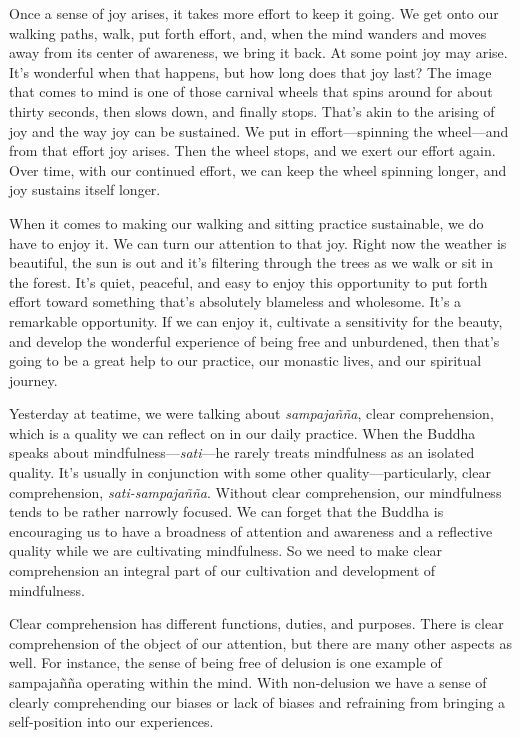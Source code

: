 Once a sense of joy arises, it takes more effort to keep it going. We 
get onto our walking paths, walk, put forth effort, and, when the mind 
wanders and moves away from its center of awareness, we bring it back. 
At some point joy may arise. It's wonderful when that happens, but how 
long does that joy last? The image that comes to mind is one of those 
carnival wheels that spins around for about thirty seconds, then slows 
down, and finally stops. That's akin to the arising of joy and the way 
joy can be sustained. We put in effort---spinning the wheel---and from 
that effort joy arises. Then the wheel stops, and we exert our effort 
again. Over time, with our continued effort, we can keep the wheel 
spinning longer, and joy sustains itself longer.

When it comes to making our walking and sitting practice sustainable, 
we do have to enjoy it. We can turn our attention to that joy. Right 
now the weather is beautiful, the sun is out and it's filtering through 
the trees as we walk or sit in the forest. It's quiet, peaceful, and 
easy to enjoy this opportunity to put forth effort toward something 
that's absolutely blameless and wholesome. It's a remarkable 
opportunity. If we can enjoy it, cultivate a sensitivity for the 
beauty, and develop the wonderful experience of being free and 
unburdened, then that's going to be a great help to our practice, our 
monastic lives, and our spiritual journey.


Yesterday at teatime, we were talking about \emph{sampajañña}, clear 
comprehension, which is a quality we can reflect on in our daily 
practice. When the Buddha speaks about mindfulness---\emph{sati}---he 
rarely treats mindfulness as an isolated quality. It's usually in 
conjunction with some other quality---particularly, clear 
comprehension, \emph{sati-sampajañña}. Without clear comprehension, 
our mindfulness tends to be rather narrowly focused. We can forget that 
the Buddha is encouraging us to have a broadness of attention and 
awareness and a reflective quality while we are cultivating 
mindfulness. So we need to make clear comprehension an integral part of 
our cultivation and development of mindfulness.

Clear comprehension has different functions, duties, and purposes. 
There is clear comprehension of the object of our attention, but there 
are many other aspects as well. For instance, the sense of being free 
of delusion is one example of sampajañña operating within the mind. 
With non-delusion we have a sense of clearly comprehending our biases 
or lack of biases and refraining from bringing a self-position into our 
experiences.

